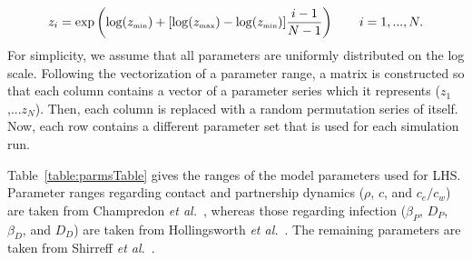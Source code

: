 \documentclass[10pt,letterpaper]{article}
\newcommand{\etal}{\textit{et al.}}
\newcommand{\tsub}[2]{#1_{{\textrm{\tiny #2}}}}
\begin{document}
\begin{equation}
z_i = \exp\left(\log(\tsub{z}{min}) + [\log(\tsub{z}{max}) - \log(\tsub{z}{min})] \frac{i-1}{N-1}\right) \qquad i = 1,...,N.
\end{equation}
For simplicity, we assume that all parameters are uniformly distributed on the log scale. Following the vectorization of a parameter range, a matrix is constructed so that each column contains a vector of a parameter series which it represents ($z_1$,...$z_N$). Then, each column is replaced with a random permutation series of itself. Now, each row contains a different parameter set that is used for each simulation run.

Table~\ref{table:parmsTable} gives the ranges of the model parameters used for LHS. Parameter ranges regarding contact and partnership dynamics ($\rho$, $c$, and $c_e/c_w$) are taken from Champredon \etal\ \cite{champredon_hiv_2013}, whereas those regarding infection ($\beta_P$, $D_P$, $\beta_D$, and $D_D$) are taken from Hollingsworth \etal\ \cite{hollingsworth_hiv1_2008}. The remaining parameters are taken from Shirreff \etal\ \cite{shirreff_transmission_2011}.

\end{document}
